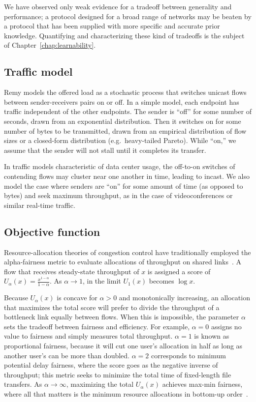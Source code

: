 We have observed only weak evidence for a tradeoff between generality
and performance; a protocol designed for a broad range of networks may
be beaten by a protocol that has been supplied with more specific and
accurate prior knowledge. Quantifying and characterizing these kind of
tradeoffs is the subject of Chapter~\ref{chap:learnability}.

\subsection{Traffic model}

Remy models the offered load as a stochastic process that switches
unicast flows between sender-receivers pairs on or off. In a simple
model, each endpoint has traffic independent of the other
endpoints. The sender is ``off'' for some number of seconds, drawn
from an exponential distribution. Then it switches on for some number
of bytes to be transmitted, drawn from an empirical distribution of
flow sizes or a closed-form distribution (e.g.~heavy-tailed
Pareto). While ``on,'' we assume that the sender will not stall until
it completes its transfer.

In traffic models characteristic of data center usage, the off-to-on
switches of contending flows may cluster near one another in time,
leading to incast. We also model the case where senders are ``on'' for
some amount of time (as opposed to bytes) and seek maximum throughput,
as in the case of videoconferences or similar real-time traffic.

\subsection{Objective function}

Resource-allocation theories of congestion control have traditionally
employed the alpha-fairness metric to evaluate allocations of
throughput on shared links~\cite{Srikant}. A flow that receives
steady-state throughput of $x$ is assigned a score of $U_\alpha(x) =
\frac{x^{1-\alpha}}{1-\alpha}$. As $\alpha \rightarrow 1$, in the
limit $U_1(x)$ becomes $\log x$.

Because $U_\alpha(x)$ is concave for $\alpha > 0$ and monotonically
increasing, an allocation that maximizes the total score will prefer
to divide the throughput of a bottleneck link equally between
flows. When this is impossible, the parameter $\alpha$ sets the
tradeoff between fairness and efficiency. For example, $\alpha = 0$
assigns no value to fairness and simply measures total
throughput. $\alpha = 1$ is known as proportional fairness, because it
will cut one user's allocation in half as long as another user's can
be more than doubled. $\alpha = 2$ corresponds to minimum potential
delay fairness, where the score goes as the negative inverse of
throughput; this metric seeks to minimize the total time of
fixed-length file transfers. As $\alpha \rightarrow \infty$,
maximizing the total $U_\alpha(x)$ achieves max-min fairness, where
all that matters is the minimum resource allocations in bottom-up
order~\cite{Srikant}.


